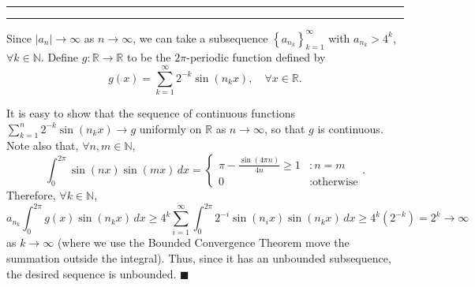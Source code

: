 \documentclass[11pt]{article}
\newcounter{questionCounter}
\newcounter{partCounter}[questionCounter]
\newenvironment{question}[2][\arabic{questionCounter}]{%
    \setcounter{partCounter}{0}%
    \vspace{.25in} \hrule \vspace{0.5em}%
        \noindent{\bf #2}%
    \vspace{0.8em} \hrule \vspace{.10in}%
    \addtocounter{questionCounter}{1}%
}{}
\renewcommand{\qed}{\quad $\blacksquare$}
\newcommand{\N}{\mathbb{N}} %
\newcommand{\R}{\mathbb{R}} %
\begin{document}
\begin{question}{Problem 10}
Since $|a_n| \rightarrow \infty$ as $n \rightarrow \infty$, we can take a
subsequence $\left\{ a_{n_k} \right\}_{k = 1}^{\infty}$ with $a_{n_k} > 4^k$,
$\forall k \in \N$. Define $g : \R \rightarrow \R$ to be the $2\pi$-periodic
function defined by
\[g(x) = \sum_{k = 1}^{\infty} 2^{-k} \sin(n_k x),
\quad \forall x \in \R.\]

It is easy to show that the sequence of continuous functions
$\sum_{k = 1}^n 2^{-k} \sin(n_k x) \rightarrow g$ uniformly on $\R$ as
$n \rightarrow \infty$, so that $g$ is continuous. Note also that,
$\forall n,m \in \N$,
\[\int_0^{2\pi} \sin(nx) \sin(mx) \, dx
 =  \left\{
        \begin{array}{cl}
            \pi - \frac{\sin(4 \pi n)}{4n} \geq 1   & : n = m               \\
            0                                       & : \mbox{otherwise}
        \end{array}
    \right..
\]
Therefore, $\forall k \in \N$,
\[
      a_{n_k} \int_0^{2\pi} g(x) \sin(n_k x) \, dx
 \geq 4^k \sum_{i = 1}^{\infty}
                \int_0^{2\pi} 2^{-i} \sin(n_i x) \sin(n_k x) \, dx
 \geq 4^k \left( 2^{-k} \right)
 =    2^k \rightarrow \infty
\]
as $k \rightarrow \infty$ (where we use the Bounded Convergence Theorem move
the summation outside the integral). Thus, since it has an unbounded
subsequence, the desired sequence is unbounded. \qed
\end{question}
\end{document}
